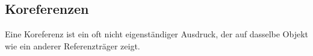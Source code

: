 \subsection{Koreferenzen}
Eine Koreferenz ist ein oft nicht eigenständiger Ausdruck, der auf dasselbe Objekt wie ein anderer Referenzträger zeigt.\\

